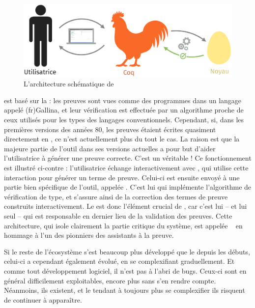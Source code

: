 \begin{figure}[h]
  \centering
  \includegraphics{./figures/coq-kernel-fr.pdf}

  \caption{L’architecture schématique de }
  \label{fig:coq}
\end{figure}


 est basé sur la  : les preuves sont vues comme des programmes dans un langage appelé \intro(fr){Gallina},
et leur vérification est effectuée par un algorithme proche
de ceux utilisés pour les types des langages conventionnels.
Cependant, si, dans les premières versions des années 80, les preuves  étaient
écrites quasiment directement en ,
ce n’est actuellement plus du tout le cas.
La raison est que la majeure partie de l’outil dans ses versions actuelles a
pour but d’aider l’utilisatrice à générer une preuve correcte. C’est un véritable
 !
Ce fonctionnement est illustré ci-contre : l’utilisatrice échange interactivement avec , qui utilise cette interaction pour générer un terme de preuve. Celui-ci est ensuite envoyé à une partie bien spécifique de l’outil, appelée .
C’est lui qui implémente l’algorithme de vérification de type, et s’assure ainsi de la correction des termes de preuve construits interactivement.
Le  est donc l’élément crucial de , car c’est lui – et lui seul – qui est responsable en dernier lieu de la validation des preuves.
Cette architecture, qui isole clairement la partie critique du système,
est appelée ~ en 
hommage à l’un des pionniers des assistants à la preuve.

Si le reste de l’écosystème s’est beaucoup plus développé que le  depuis les débuts, celui-ci a cependant également évolué, en se complexifiant graduellement.
Et comme tout développement logiciel, il n’est pas à l’abri de bugs.
Ceux-ci sont en général difficilement exploitables,
encore plus sans s’en rendre compte.
Néanmoins, ils existent,
et le  tendant à toujours plus se complexifier
ils risquent de continuer à apparaître.

